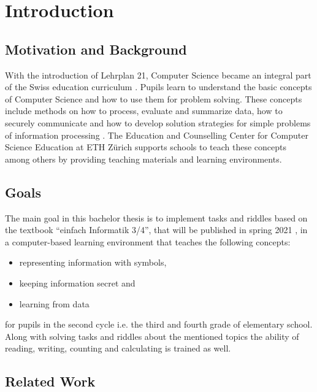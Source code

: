 \chapter{Introduction}

\section{Motivation and Background}

With the introduction of Lehrplan 21, Computer Science became an integral part of the Swiss education curriculum \cite{Lehrplan21}. Pupils learn to understand the basic concepts of Computer Science and how to use them for problem solving. These concepts include methods on how to process, evaluate and summarize data, how to securely communicate and how to develop solution strategies for simple problems of information processing \cite{MedienUndInformatik}. The Education and Counselling Center for Computer Science Education at ETH Zürich \cite{ABZ} supports schools to teach these concepts among others by providing teaching materials and learning environments.

\section{Goals}

The main goal in this bachelor thesis is to implement tasks and riddles based on the textbook “einfach Informatik 3/4”, that will be published in spring 2021 \cite{EinfachInformatik}, in a computer-based learning environment that teaches the following concepts:

\begin{itemize}
    \item representing information with symbols,
    \item keeping information secret and
    \item learning from data
\end{itemize}

for pupils in the second cycle i.e. the third and fourth grade of elementary school.
Along with solving tasks and riddles about the mentioned topics the ability of reading, writing, counting and calculating is trained as well.

\section{Related Work}


